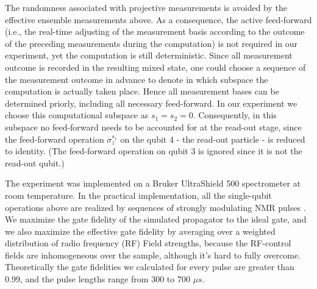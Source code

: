 \documentclass[showpacs,superscriptaddress,twocolumn,prl]{revtex4}
\begin{document}
The randomness associated with projective measurements is avoided by the
effective ensemble measurements above. As a consequence, the active
feed-forward (i.e., the real-time adjusting of the measurement basis
according to the outcome of the preceding measurements during the
computation) is not required in our experiment, yet the computation is still
deterministic. Since all measurement outcome is recorded in the resulting
mixed state, one could choose a sequence of the measurement outcome in
advance to denote in which subspace the computation is actually taken place.
Hence all measurement bases can be determined priorly, including all
necessary feed-forward. In our experiment we choose this computational
subspace as $s_{1}=s_{2}=0$. Consequently, in this subspace no feed-forward
needs to be accounted for at the read-out stage, since the feed-forward
operation $\sigma _{z}^{s_{1}}$ on the qubit 4 - the read-out particle - is
reduced to identity. (The feed-forward operation on qubit 3 is ignored since
it is not the read-out qubit.)

The experiment was implemented on a Bruker UltraShield 500 spectrometer at
room temperature. In the practical implementation, all the single-qubit
operations above are realized by sequences of strongly modulating NMR pulses
\cite{smp}. We maximize the gate fidelity of the simulated propagator to the
ideal gate, and we also maximize the effective gate fidelity by averaging
over a weighted distribution of radio frequency (RF) Field strengths,
because the RF-control fields are inhomogeneous over the sample, although
it's hard to fully overcome. Theoretically the gate fidelities we calculated
for every pulse are greater than 0.99, and the pulse lengths range from 300
to 700 $\mu s$.
\end{document}

